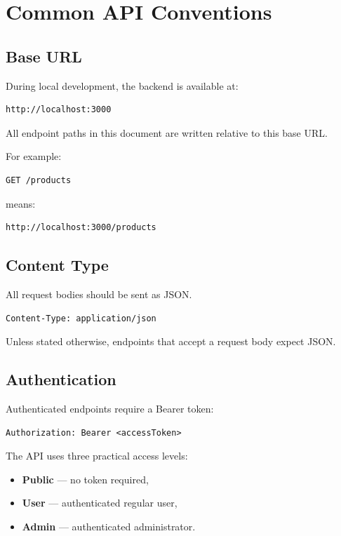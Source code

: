 
\section{Common API Conventions}

\subsection{Base URL}

During local development, the backend is available at:

\begin{verbatim}
http://localhost:3000
\end{verbatim}

All endpoint paths in this document are written relative to this base URL.

For example:

\begin{verbatim}
GET /products
\end{verbatim}

means:

\begin{verbatim}
http://localhost:3000/products
\end{verbatim}

\subsection{Content Type}

All request bodies should be sent as JSON.

\begin{verbatim}
Content-Type: application/json
\end{verbatim}

Unless stated otherwise, endpoints that accept a request body expect JSON.

\subsection{Authentication}

Authenticated endpoints require a Bearer token:

\begin{verbatim}
Authorization: Bearer <accessToken>
\end{verbatim}

The API uses three practical access levels:

\begin{itemize}
    \item \textbf{Public} --- no token required,
    \item \textbf{User} --- authenticated regular user,
    \item \textbf{Admin} --- authenticated administrator.
\end{itemize}

